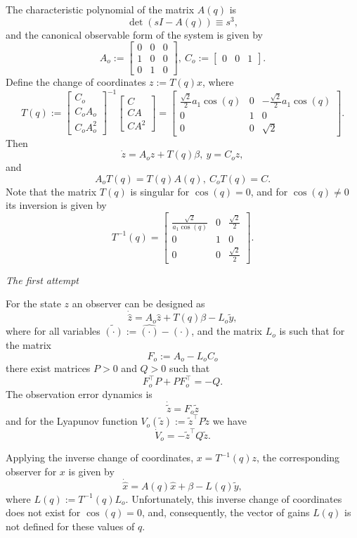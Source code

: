 The characteristic polynomial of the matrix $A(q)$ is 
\[
	\det\left(sI-A(q)\right) \equiv s^3,
\]
and the canonical observable form of the system is given by
\[
	A_o := \begin{bmatrix} 0 & 0 & 0\\ 1 & 0 & 0\\ 0 & 1 & 0  \end{bmatrix}, \ C_o := \begin{bmatrix} 0 & 0 & 1 \end{bmatrix}.
\]
Define the change of coordinates $z:=T(q)x$, where
\[
	T(q) := \begin{bmatrix} C_o \\ C_oA_o \\ C_oA_o^2 \end{bmatrix}^{-1}
			  \begin{bmatrix} C \\ CA \\ CA^2 \end{bmatrix}  =
			  \begin{bmatrix} \frac{\sqrt{2}}{2}a_{1}\cos(q) & 0 & -\frac{\sqrt{2}}{2}a_{1}\cos(q)\\ 0 & 1 & 0\\ 0 & 0 & \sqrt{2} \end{bmatrix}.
\]
Then 
\[
	\dot{z} = A_o z + T(q)\beta, \ y= C_oz,
\]
and 
\[
	A_oT(q) = T(q)A(q), \ C_oT(q) = C.
\]
Note that the matrix $T(q)$ is singular for $\cos(q)=0$, and for $\cos(q)\ne0$ its inversion is given by
\[
	T^{-1}(q) = \begin{bmatrix} \frac{\sqrt{2}}{a_{1}\cos(q)} & 0 & \frac{\sqrt{2}}{2}\\ 0 & 1 & 0\\ 0 & 0 & \frac{\sqrt{2}}{2} \end{bmatrix}.
\] 

\noindent\emph{The first attempt}

For the state $z$ an observer can be designed as
\[
	\dot{\hat{z}} = A_o \hat{z} + T(q) \beta -L_o\tilde{y},
\]
where for all variables $\tilde{\left(\cdot\right)}:=\hat{\left(\cdot\right)}-\left(\cdot\right)$, and the matrix $L_o$ is such that for the matrix
\[
	F_o:=A_o -L_o C_o
\]
there exist matrices $P>0$ and $Q>0$ such that
\[
	F_o^\top P + PF_o^\top = -Q.
\]
The observation error dynamics is
\[
	\dot{\tilde{z}} = F_o \tilde{z}
\]
and for the Lyapunov function $V_o(\tilde{z}):=\tilde{z}^\top P \tilde{z}$ we have
\[
	\dot{V}_o = -\tilde{z}^\top Q\tilde{z}.
\]

Applying the inverse change of coordinates, $x=T^{-1}(q)z$, the corresponding observer for $x$ is given by
\begin{equation} \label{eq:ObsX}
	\dot{\hat{x}} = A(q)\hat{x} + \beta - L(q)\tilde{y},
\end{equation}
where $L(q):= T^{-1}(q)L_o$. Unfortunately, this inverse change of coordinates does not exist for $\cos(q)=0$, and, consequently, the vector of gains $L(q)$ is not defined for these values of $q$.

